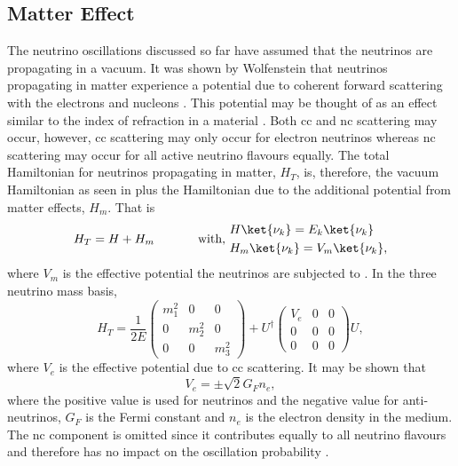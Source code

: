 \subsection{Matter Effect}
The neutrino oscillations discussed so far have assumed that the neutrinos are propagating in a vacuum. It was shown by Wolfenstein that neutrinos propagating in matter experience a potential due to coherent forward scattering with the electrons and nucleons \cite{Wolfenstein}. This potential may be thought of as an effect similar to the index of refraction in a material \cite{Fundamentals_of_Neutrino_Physics_and_Astrophysics}. Both \gls{cc} and \gls{nc} scattering may occur, however, \gls{cc} scattering may only occur for electron neutrinos whereas \gls{nc} scattering may occur for all active neutrino flavours equally. The total Hamiltonian for neutrinos propagating in matter, $H_T$, is, therefore, the vacuum Hamiltonian as seen in  plus the Hamiltonian due to the additional potential from matter effects, $H_m$. That is 
\begin{equation}
    H_T = H + H_m \text{ \hspace{1cm} with, } \begin{split}
        & H\ket{\nu_k} = E_k\ket{\nu_k} \\
        & H_m\ket{\nu_k} = V_m\ket{\nu_k},
    \end{split}
\end{equation} 
where $V_m$ is the effective potential the neutrinos are subjected to \cite{Fundamentals_of_Neutrino_Physics_and_Astrophysics}. In the three neutrino mass basis,
\begin{equation}
H_T = \frac{1}{2E} 
\begin{pmatrix}
m_1^2 & 0 & 0 \\
0 & m_2^2 & 0 \\
0 & 0 & m_3^2
\end{pmatrix}
+ U^\dag
\begin{pmatrix}
V_e & 0 & 0 \\
0 & 0 & 0 \\
0 & 0 & 0
\end{pmatrix}
U,
\end{equation}
where $V_e$ is the effective potential due to \gls{cc} scattering. It may be shown that 
\begin{equation}
    V_e = \pm \sqrt{2}G_Fn_e,
\end{equation}
where the positive value is used for neutrinos and the negative value for anti-neutrinos, $G_F$ is the Fermi constant and $n_e$ is the electron density in the medium.
The \gls{nc} component is omitted since it contributes equally to all neutrino flavours and therefore has no impact on the oscillation probability \cite{PDG_2022}. 

